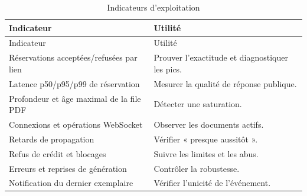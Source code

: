\begingroup\small\setlength{\tabcolsep}{3pt}\renewcommand{\arraystretch}{1.25}
\begin{longtable}{|P{0.26\textwidth}|P{0.69\textwidth}|}
\caption{Indicateurs d’exploitation}\\
\hline
Indicateur & Utilité \\ \hline
\endfirsthead
\hline
Indicateur & Utilité \\ \hline
\endhead
\endfoot

Réservations acceptées/refusées par lien & Prouver l'exactitude et diagnostiquer les pics. \\ \hline

Latence p50/p95/p99 de réservation & Mesurer la qualité de réponse publique. \\ \hline

Profondeur et âge maximal de la file PDF & Détecter une saturation. \\ \hline

Connexions et opérations WebSocket & Observer les documents actifs. \\ \hline

Retards de propagation & Vérifier « presque aussitôt ». \\ \hline

Refus de crédit et blocages & Suivre les limites et les abus. \\ \hline

Erreurs et reprises de génération & Contrôler la robustesse. \\ \hline

Notification du dernier exemplaire & Vérifier l'unicité de l'événement. \\ \hline

\end{longtable}\endgroup
